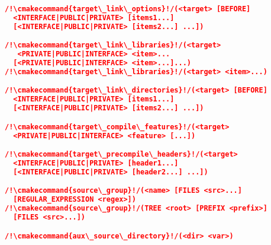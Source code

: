 \documentclass{article}
\newcommand{\cmakecommand}[1]{{\href{https://cmake.org/cmake/help/v3.20/command/#1.html}{#1}}}
\begin{document}
\begin{minipage}[t]{0.18\linewidth}
\begin{lstlisting}[language=CMake]
/!\cmakecommand{target\_link\_options}!/(<target> [BEFORE]
  <INTERFACE|PUBLIC|PRIVATE> [items1...]
  [<INTERFACE|PUBLIC|PRIVATE> [items2...] ...])

/!\cmakecommand{target\_link\_libraries}!/(<target>
   <PRIVATE|PUBLIC|INTERFACE> <item>...
  [<PRIVATE|PUBLIC|INTERFACE> <item>...]...)
/!\cmakecommand{target\_link\_libraries}!/(<target> <item>...)

/!\cmakecommand{target\_link\_directories}!/(<target> [BEFORE]
  <INTERFACE|PUBLIC|PRIVATE> [items1...]
  [<INTERFACE|PUBLIC|PRIVATE> [items2...] ...])

/!\cmakecommand{target\_compile\_features}!/(<target>
  <PRIVATE|PUBLIC|INTERFACE> <feature> [...])

/!\cmakecommand{target\_precompile\_headers}!/(<target>
  <INTERFACE|PUBLIC|PRIVATE> [header1...]
  [<INTERFACE|PUBLIC|PRIVATE> [header2...] ...])

/!\cmakecommand{source\_group}!/(<name> [FILES <src>...]
  [REGULAR_EXPRESSION <regex>])
/!\cmakecommand{source\_group}!/(TREE <root> [PREFIX <prefix>]
  [FILES <src>...])

/!\cmakecommand{aux\_source\_directory}!/(<dir> <var>)
\end{lstlisting}

\end{minipage}
\hfill\vline\hfill
\end{document}

